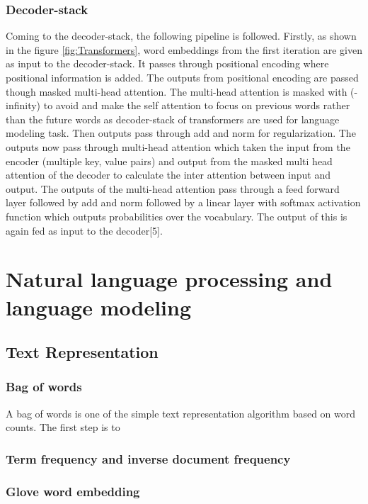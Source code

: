 \subsubsection{Decoder-stack}
Coming to the decoder-stack, the following pipeline is followed. Firstly, as shown in the figure \ref{fig:Transformers}, word embeddings from the first iteration are given as input to the decoder-stack. It passes through positional encoding where positional information is added. The outputs from positional encoding are passed though masked multi-head attention. The multi-head attention is masked with (-infinity) to avoid and make the self attention to focus on previous words rather than the future words as decoder-stack of transformers are used for language modeling task. Then outputs pass through add and norm for regularization. The outputs now pass through multi-head attention which taken the input from the encoder (multiple key, value pairs) and output from the masked multi head attention of the decoder to calculate the inter attention between input and output. The outputs of the multi-head attention pass through a feed forward layer followed by add and norm followed by a linear layer with softmax activation function which outputs probabilities over the vocabulary. The output of this is again fed as input to the decoder[5]\cite{vaswani2017attention}. 

\section{Natural language processing and language modeling}

\subsection{Text Representation}
\subsubsection{Bag of words}
A bag of words is one of the simple text representation algorithm based on word counts. The first step is to 

\subsubsection{Term frequency and inverse document frequency}

\subsubsection{Glove word embedding}

